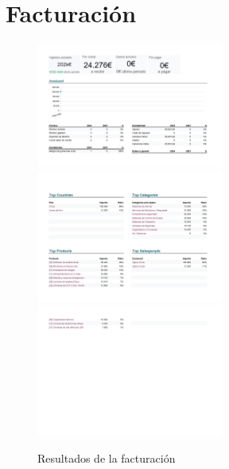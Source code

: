 \documentclass{report}
\begin{document}
        \section*{Facturación}
            \begin{figure}[H]
                \centering
                \includegraphics[width=0.55\textwidth]{./img/Facturacion1.png}
                \includegraphics[width=0.55\textwidth]{./img/Facturacion2.png}
                \includegraphics[width=0.55\textwidth]{./img/Facturacion3.png}
                \caption{Resultados de la facturación}
            \end{figure}
\end{document}
